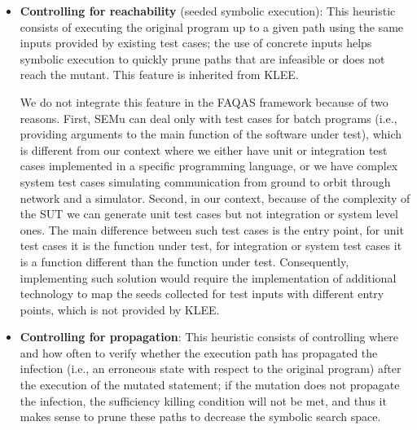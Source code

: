 \begin{itemize}
	\item \textbf{Controlling for reachability} (seeded symbolic execution): This heuristic consists of executing the original program up to a given path using the same inputs provided by existing test cases; the use of concrete inputs helps symbolic execution to quickly prune paths that are infeasible or does not reach the mutant. This feature is inherited from KLEE.
	
	
	
	We do not integrate this feature in the FAQAS framework because of two reasons. 
	First, SEMu can deal only with test cases for batch programs (i.e., providing arguments to the main function of the software under test), which is different from our context where we either have unit or integration test cases implemented in a specific programming language, or we have complex system test cases simulating communication from ground to orbit through network and a simulator. 
	Second, in our context, because of the complexity of the SUT we can generate unit test cases but not integration or system level ones. The main difference between such test cases is the entry point, for unit test cases it is the function under test, for integration or system test cases it is a function different than the function under test. Consequently, implementing such solution would require the implementation of additional technology to map the seeds collected for test inputs with different entry points, which is not provided by KLEE.

	\item \textbf{Controlling for propagation}: This heuristic consists of controlling where and how often to verify whether the execution path has propagated the infection (i.e., an erroneous state with respect to the original program) after the execution of the mutated statement; if the mutation does not propagate the infection, the sufficiency killing condition will not be met, and thus it makes sense to prune these paths to decrease the symbolic search space.


\end{itemize}
